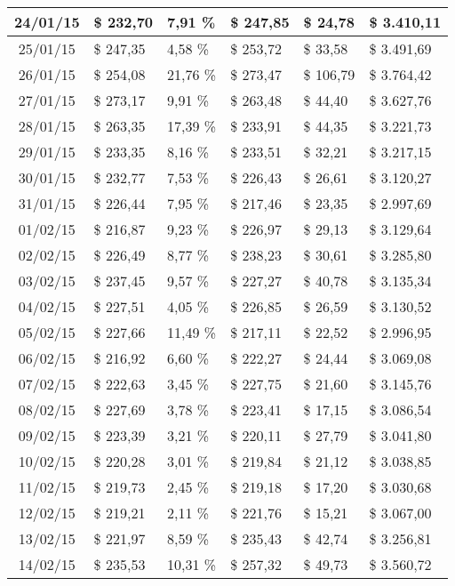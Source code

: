 \begin{small}
\begin{longtable}{|c|l|l|l|l|l|}
24/01/15 & \$ 232,70 & 7,91 \% & \$ 247,85 & \$ 24,78 & \$ 3.410,11 \\ \hline
25/01/15 & \$ 247,35 & 4,58 \% & \$ 253,72 & \$ 33,58 & \$ 3.491,69 \\ \hline
26/01/15 & \$ 254,08 & 21,76 \% & \$ 273,47 & \$ 106,79 & \$ 3.764,42 \\ \hline
27/01/15 & \$ 273,17 & 9,91 \% & \$ 263,48 & \$ 44,40 & \$ 3.627,76 \\ \hline
28/01/15 & \$ 263,35 & 17,39 \% & \$ 233,91 & \$ 44,35 & \$ 3.221,73 \\ \hline
29/01/15 & \$ 233,35 & 8,16 \% & \$ 233,51 & \$ 32,21 & \$ 3.217,15 \\ \hline
30/01/15 & \$ 232,77 & 7,53 \% & \$ 226,43 & \$ 26,61 & \$ 3.120,27 \\ \hline
31/01/15 & \$ 226,44 & 7,95 \% & \$ 217,46 & \$ 23,35 & \$ 2.997,69 \\ \hline
01/02/15 & \$ 216,87 & 9,23 \% & \$ 226,97 & \$ 29,13 & \$ 3.129,64 \\ \hline
02/02/15 & \$ 226,49 & 8,77 \% & \$ 238,23 & \$ 30,61 & \$ 3.285,80 \\ \hline
03/02/15 & \$ 237,45 & 9,57 \% & \$ 227,27 & \$ 40,78 & \$ 3.135,34 \\ \hline
04/02/15 & \$ 227,51 & 4,05 \% & \$ 226,85 & \$ 26,59 & \$ 3.130,52 \\ \hline
05/02/15 & \$ 227,66 & 11,49 \% & \$ 217,11 & \$ 22,52 & \$ 2.996,95 \\ \hline
06/02/15 & \$ 216,92 & 6,60 \% & \$ 222,27 & \$ 24,44 & \$ 3.069,08 \\ \hline
07/02/15 & \$ 222,63 & 3,45 \% & \$ 227,75 & \$ 21,60 & \$ 3.145,76 \\ \hline
08/02/15 & \$ 227,69 & 3,78 \% & \$ 223,41 & \$ 17,15 & \$ 3.086,54 \\ \hline
09/02/15 & \$ 223,39 & 3,21 \% & \$ 220,11 & \$ 27,79 & \$ 3.041,80 \\ \hline
10/02/15 & \$ 220,28 & 3,01 \% & \$ 219,84 & \$ 21,12 & \$ 3.038,85 \\ \hline
11/02/15 & \$ 219,73 & 2,45 \% & \$ 219,18 & \$ 17,20 & \$ 3.030,68 \\ \hline
12/02/15 & \$ 219,21 & 2,11 \% & \$ 221,76 & \$ 15,21 & \$ 3.067,00 \\ \hline
13/02/15 & \$ 221,97 & 8,59 \% & \$ 235,43 & \$ 42,74 & \$ 3.256,81 \\ \hline
14/02/15 & \$ 235,53 & 10,31 \% & \$ 257,32 & \$ 49,73 & \$ 3.560,72 \\ \hline

\end{longtable}
\end{small}
